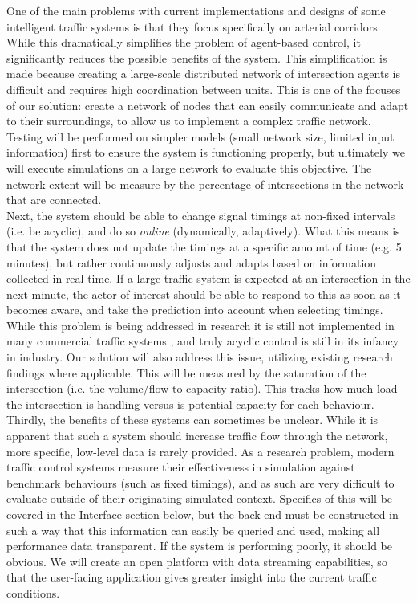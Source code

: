 \documentclass{article}
\begin{document}
One of the main problems with current implementations and designs of some intelligent traffic systems is that they focus specifically on arterial corridors \cite{ACS:2008}.
While this dramatically simplifies the problem of agent-based control, it significantly reduces the possible benefits of the system.
This simplification is made because creating a large-scale distributed network of intersection agents is difficult and requires high coordination between units.
This is one of the focuses of our solution: create a network of nodes that can easily communicate and adapt to their surroundings, to allow us to implement a complex traffic network.
Testing will be performed on simpler models (small network size, limited input information) first to ensure the system is functioning properly, but ultimately we will execute simulations on a large network to evaluate this objective.
The network extent will be measure by the percentage of intersections in the network that are connected.\\

Next, the system should be able to change signal timings at non-fixed intervals (i.e. be acyclic), and do so \emph{online} (dynamically, adaptively).
What this means is that the system does not update the timings at a specific amount of time (e.g. 5 minutes), but rather continuously adjusts and adapts based on information collected in real-time.
If a large traffic system is expected at an intersection in the next minute, the actor of interest should be able to respond to this as soon as it becomes aware, and take the prediction into account when selecting timings.
While this problem is being addressed in research it is still not implemented in many commercial traffic systems \cite{155481, 5349439, ACS:2008}, and truly acyclic control is still in its infancy in industry.
Our solution will also address this issue, utilizing existing research findings where applicable.
This will be measured by the saturation of the intersection (i.e. the volume/flow-to-capacity ratio).
This tracks how much load the intersection is handling versus is potential capacity for each behaviour.\\

Thirdly, the benefits of these systems can sometimes be unclear.
While it is apparent that such a system should increase traffic flow through the network, more specific, low-level data is rarely provided.
As a research problem, modern traffic control systems measure their effectiveness in simulation against benchmark behaviours (such as fixed timings), and as such are very difficult to evaluate outside of their originating simulated context.
Specifics of this will be covered in the Interface section below, but the back-end must be constructed in such a way that this information can easily be queried and used, making all performance data transparent.
If the system is performing poorly, it should be obvious.
We will create an open platform with data streaming capabilities, so that the user-facing application gives greater insight into the current traffic conditions.
\end{document}
